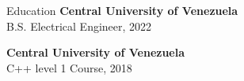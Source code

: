 \documentclass{resume} %
\begin{document}

\begin{rSection}{Education} %
    \textbf{Central University of Venezuela}\\
    B.S. Electrical Engineer, 2022

    \textbf{Central University of Venezuela}\\
    C++ level 1 Course, 2018


\end{rSection}



\end{document}
